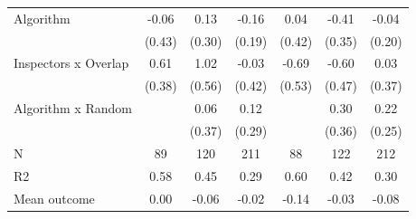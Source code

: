 \begin{tabular}{lccc|ccc}
Algorithm   &       -0.06         &        0.13         &       -0.16         &        0.04         &       -0.41         &       -0.04         \\
            &      (0.43)         &      (0.30)         &      (0.19)         &      (0.42)         &      (0.35)         &      (0.20)         \\
\addlinespace
Inspectors x Overlap&        0.61         &        1.02\sym{*}  &       -0.03         &       -0.69         &       -0.60         &        0.03         \\
            &      (0.38)         &      (0.56)         &      (0.42)         &      (0.53)         &      (0.47)         &      (0.37)         \\
\addlinespace
Algorithm x Random&                     &        0.06         &        0.12         &                     &        0.30         &        0.22         \\
            &                     &      (0.37)         &      (0.29)         &                     &      (0.36)         &      (0.25)         \\
\midrule
N           &          89         &         120         &         211         &          88         &         122         &         212         \\
R2          &        0.58         &        0.45         &        0.29         &        0.60         &        0.42         &        0.30         \\
Mean outcome&        0.00         &       -0.06         &       -0.02         &       -0.14         &       -0.03         &       -0.08         \\
\bottomrule \end{tabular}
